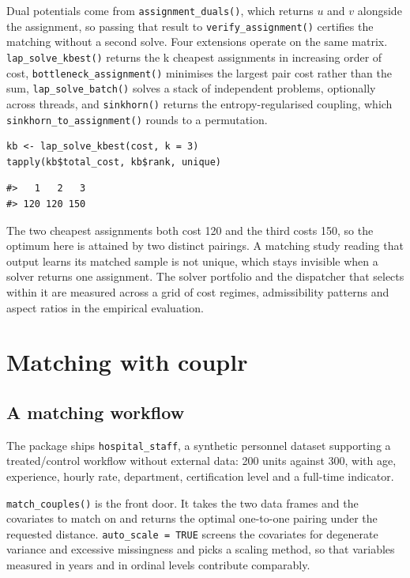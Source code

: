 Dual potentials come from \texttt{assignment\_duals()}, which returns \(u\) and \(v\)
alongside the assignment, so passing that result to \texttt{verify\_assignment()}
certifies the matching without a second solve. Four extensions operate on the same matrix. \texttt{lap\_solve\_kbest()} returns the k cheapest assignments in
increasing order of cost, \texttt{bottleneck\_assignment()} minimises the largest pair
cost rather than the sum, \texttt{lap\_solve\_batch()} solves a stack of independent
problems, optionally across threads, and \texttt{sinkhorn()} returns the entropy-regularised coupling, which \texttt{sinkhorn\_to\_assignment()} rounds to a
permutation.

\begin{verbatim}
kb <- lap_solve_kbest(cost, k = 3)
tapply(kb$total_cost, kb$rank, unique)
\end{verbatim}

\begin{verbatim}
#>   1   2   3 
#> 120 120 150
\end{verbatim}

The two cheapest assignments both cost 120 and the third costs 150, so the
optimum here is attained by two distinct pairings. A matching study reading
that output learns its matched sample is not unique, which stays invisible
when a solver returns one assignment. The solver portfolio and the
dispatcher that selects within it are measured across a grid of cost regimes,
admissibility patterns and aspect ratios in the empirical evaluation.

\section{Matching with couplr}\label{matching-with-couplr}

\subsection{A matching workflow}\label{a-matching-workflow}

The package ships \texttt{hospital\_staff}, a synthetic personnel dataset supporting a
treated/control workflow without external data: 200 units against 300, with
age, experience, hourly rate, department, certification level and a full-time
indicator.

\texttt{match\_couples()} is the front door. It takes the two data frames and the
covariates to match on and returns the optimal one-to-one pairing under the requested distance. \texttt{auto\_scale\ =\ TRUE} screens the covariates for degenerate
variance and excessive missingness and picks a scaling method, so that
variables measured in years and in ordinal levels contribute comparably.

